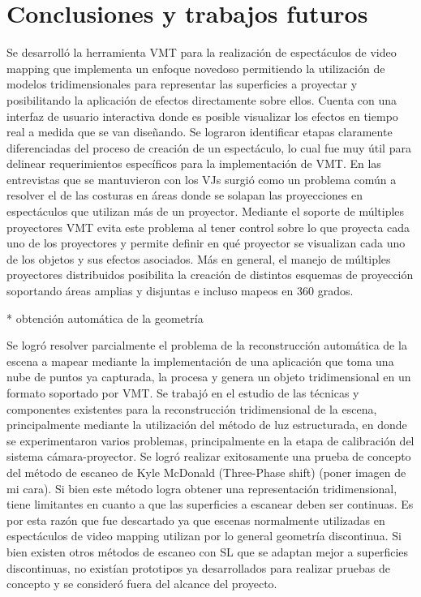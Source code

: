 ﻿\chapter{Conclusiones y trabajos futuros}

Se desarrolló la herramienta VMT para la realización de espectáculos de video mapping que implementa un enfoque novedoso permitiendo la utilización de modelos tridimensionales para representar las superficies a proyectar y posibilitando la aplicación de efectos directamente sobre ellos. Cuenta con una interfaz de usuario interactiva donde es posible visualizar los efectos en tiempo real a medida que se van diseñando.
Se lograron identificar etapas claramente diferenciadas del proceso de creación de un espectáculo, lo cual fue muy útil para delinear requerimientos específicos para la implementación de VMT. 
En las entrevistas que se mantuvieron con los VJs surgió como un problema común a resolver el de las costuras en áreas donde se solapan las proyecciones en espectáculos que utilizan más de un proyector. Mediante el soporte de múltiples proyectores VMT evita este problema al tener control sobre lo que proyecta cada uno de los proyectores y permite definir en qué proyector se visualizan cada uno de los objetos y sus efectos asociados. Más en general, el manejo de múltiples proyectores distribuidos posibilita la creación de distintos esquemas de proyección soportando áreas amplias y disjuntas e incluso mapeos en 360 grados.

* obtención automática de la geometría

Se logró resolver parcialmente el problema de la reconstrucción automática de la escena a mapear mediante la implementación de una aplicación que toma una nube de puntos ya capturada, la procesa y genera un objeto tridimensional en un formato soportado por VMT.
Se trabajó en el estudio de las técnicas y componentes existentes para la reconstrucción tridimensional de la escena, principalmente mediante la utilización del método de luz estructurada, en donde se experimentaron varios problemas, principalmente en la etapa de calibración del sistema cámara-proyector. 
Se logró realizar exitosamente una prueba de concepto del método de escaneo de Kyle McDonald  (Three-Phase shift) (poner imagen de mi cara). Si bien este método logra obtener una representación tridimensional, tiene limitantes en cuanto a que las superficies a escanear deben ser continuas. Es por esta razón que fue descartado ya que escenas normalmente utilizadas en espectáculos de video mapping utilizan por lo general geometría discontinua.
Si bien existen otros métodos de escaneo con SL que se adaptan mejor a superficies discontinuas, no existían prototipos ya desarrollados para realizar pruebas de concepto y se consideró fuera del alcance del proyecto.

